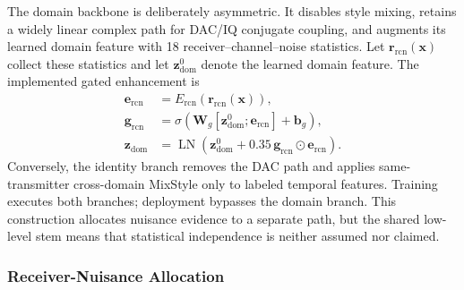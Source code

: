 \documentclass[journal]{IEEEtran}
\begin{document}
The domain backbone is deliberately asymmetric. It disables style mixing, retains a widely linear complex path for DAC/IQ conjugate coupling, and augments its learned domain feature with 18 receiver--channel--noise statistics. Let \(\mathbf{r}_{\mathrm{rcn}}(\mathbf{x})\) collect these statistics and let \(\mathbf{z}_{\mathrm{dom}}^{0}\) denote the learned domain feature. The implemented gated enhancement is
\begin{align}
\mathbf{e}_{\mathrm{rcn}}&=E_{\mathrm{rcn}}
\!\left(\mathbf{r}_{\mathrm{rcn}}(\mathbf{x})\right),\\
\mathbf{g}_{\mathrm{rcn}}&=\sigma\!\left(
\mathbf{W}_{g}[\mathbf{z}_{\mathrm{dom}}^{0};\mathbf{e}_{\mathrm{rcn}}]
+\mathbf{b}_{g}\right),\\
\mathbf{z}_{\mathrm{dom}}&=\operatorname{LN}\!\left(
\mathbf{z}_{\mathrm{dom}}^{0}
+0.35\,\mathbf{g}_{\mathrm{rcn}}\odot\mathbf{e}_{\mathrm{rcn}}
\right).
\label{eq:rcn_enhance}
\end{align}
Conversely, the identity branch removes the DAC path and applies same-transmitter cross-domain MixStyle \cite{zhou2021mixstyle} only to labeled temporal features. Training executes both branches; deployment bypasses the domain branch. This construction allocates nuisance evidence to a separate path, but the shared low-level stem means that statistical independence is neither assumed nor claimed.

\subsubsection{Receiver-Nuisance Allocation}
\end{document}
